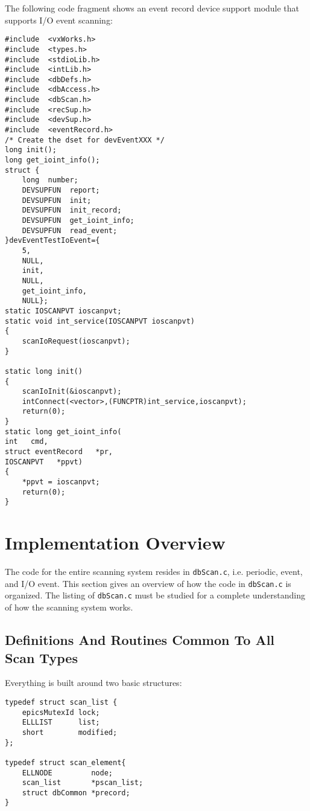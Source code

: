 The following code fragment shows an event record device support module that supports I/O event scanning: 

\begin{verbatim}
#include  <vxWorks.h>
#include  <types.h>
#include  <stdioLib.h>
#include  <intLib.h>
#include  <dbDefs.h>
#include  <dbAccess.h>
#include  <dbScan.h>
#include  <recSup.h>
#include  <devSup.h>
#include  <eventRecord.h>
/* Create the dset for devEventXXX */
long init();
long get_ioint_info();
struct {
    long  number;
    DEVSUPFUN  report;
    DEVSUPFUN  init;
    DEVSUPFUN  init_record;
    DEVSUPFUN  get_ioint_info;
    DEVSUPFUN  read_event;
}devEventTestIoEvent={
    5,
    NULL,
    init,
    NULL,
    get_ioint_info,
    NULL};
static IOSCANPVT ioscanpvt;
static void int_service(IOSCANPVT ioscanpvt)
{
    scanIoRequest(ioscanpvt);
}

static long init()
{
    scanIoInit(&ioscanpvt);
    intConnect(<vector>,(FUNCPTR)int_service,ioscanpvt);
    return(0);
}
static long get_ioint_info(
int   cmd,
struct eventRecord   *pr,
IOSCANPVT   *ppvt)
{
    *ppvt = ioscanpvt;
    return(0);
}
\end{verbatim}

\section{Implementation Overview}

The code for the entire scanning system resides in \verb|dbScan.c|, i.e. periodic, event, and I/O event. This section gives an 
overview of how the code in \verb|dbScan.c| is organized. The listing of \verb|dbScan.c| must be studied for a complete 
understanding of how the scanning system works.

\subsection{Definitions And Routines Common To All Scan Types}

Everything is built around two basic structures:

\begin{verbatim}
typedef struct scan_list {
    epicsMutexId lock;
    ELLLIST      list;
    short        modified;
};

typedef struct scan_element{
    ELLNODE         node;
    scan_list       *pscan_list;
    struct dbCommon *precord;
}
\end{verbatim}

